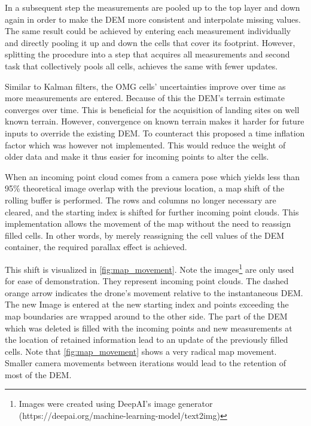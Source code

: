 In a subsequent step the measurements are pooled up to the top layer and down again in order to make the DEM more consistent and interpolate missing values. The same result could be achieved by entering each measurement individually and directly pooling it up and down the cells that cover its footprint. However, splitting the procedure into a step that acquires all measurements and second task that collectively pools all cells, achieves the same with fewer updates.

Similar to Kalman filters, the OMG cells' uncertainties improve over time as more measurements are entered. Because of this the DEM's terrain estimate converges over time. This is beneficial for the acquisition of landing sites on well known terrain. However, convergence on known terrain makes it harder for future inputs to override the existing DEM. To counteract this \citet{LSD2} proposed a time inflation factor which was however not implemented. This would reduce the weight of older data and make it thus easier for incoming points to alter the cells.

When an incoming point cloud comes from a camera pose which yields less than 95\% theoretical image overlap with the previous location, a map shift of the rolling buffer is performed. The rows and columns no longer necessary are cleared, and the starting index is shifted for further incoming point clouds. This implementation allows the movement of the map without the need to reassign filled cells. In other words, by merely reassigning the cell values of the DEM container, the required parallax effect is achieved.

This shift is visualized in \cref{fig:map_movement}. Note the images\footnote[1]{Images were created using DeepAI's image generator (https://deepai.org/machine-learning-model/text2img)} are only used for ease of demonstration. They represent incoming point clouds. The dashed orange arrow indicates the drone's movement relative to the instantaneous DEM. The new Image is entered at the new starting index and points exceeding the map boundaries are wrapped around to the other side. The part of the DEM which was deleted is filled with the incoming points and new measurements at the location of retained information lead to an update of the previously filled cells. Note that \cref{fig:map_movement} shows a very radical map movement. Smaller camera movements between iterations would lead to the retention of most of the DEM.

